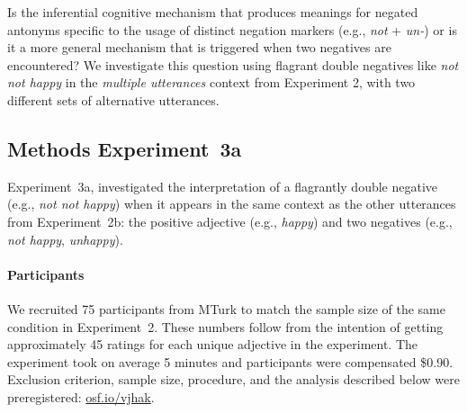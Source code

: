 \documentclass[floatsintext,doc]{apa6}
\let\oldparagraph\paragraph
\renewcommand{\paragraph}[1]{\oldparagraph{#1}\mbox{}}
\begin{document}
Is the inferential cognitive mechanism that produces meanings for negated antonyms specific to the usage of distinct negation markers (e.g., \emph{not} + \emph{un-}) or is it a more general mechanism that is triggered when two negatives are encountered?
We investigate this question using flagrant double negatives like \emph{not not happy} in the \emph{multiple utterances} context from Experiment 2, with two different sets of alternative utterances. 




\subsection{Methods Experiment~3a}

Experiment~3a, investigated the interpretation of a flagrantly double negative (e.g., \emph{not not happy}) when it appears in the same context as the other utterances from Experiment~2b: the positive adjective (e.g., \emph{happy}) and two negatives (e.g., \emph{not happy}, \emph{unhappy}).


\paragraph{Participants}\label{participants-3}
We recruited 75 participants from MTurk to match the sample size of the same condition in Experiment~2.
These numbers follow from the intention of getting approximately 45 ratings for each unique adjective in the experiment.
The experiment took on average 5 minutes and participants were compensated \$0.90.
Exclusion criterion, sample size, procedure, and the analysis described below were preregistered: \url{osf.io/vjhak}.
\end{document}
